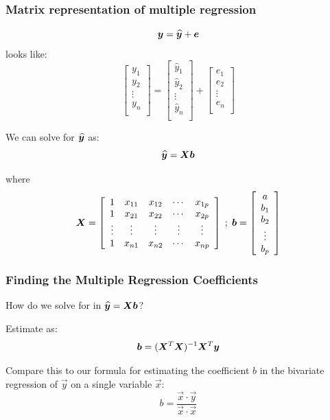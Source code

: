 \documentclass{beamer}
\begin{document}
\begin{frame}
  \frametitle{Matrix representation of multiple regression}


$$
\bm{y} = \widehat{\bm{y}} + \bm{e}
$$
looks like:
$$
\left[ \begin{array}{c}
y_1 \\ y_2 \\ \vdots \\y_n \\
\end{array}
\right] = 
\left[ \begin{array}{c}
\hat{y}_1 \\ \hat{y}_2 \\ \vdots \\\hat{y}_n \\
\end{array}
\right]+
\left[ \begin{array}{c}
e_1 \\ e_2 \\ \vdots \\e_n \\
\end{array}
\right]
$$

\medskip

We can solve for $\widehat{\bm{y}}$ as:
%
$$
\widehat{\bm{y}} = \bm{X}\bm{b}
$$

where
%
$$
\bm{X} = \left[ \begin{array}{ccccc}
1 & x_{11} & x_{12} & \cdots & x_{1p} \\
1 & x_{21} & x_{22} & \cdots & x_{2p} \\
\vdots & \vdots & \vdots & \vdots & \vdots \\
1 & x_{n1} & x_{n2} & \cdots & x_{np} \\
\end{array}
\right]
\;
;
\;
\bm{b} = \left[ \begin{array}{c}
a \\ b_1 \\ b_2 \\ \vdots \\ b_p \\
\end{array}
\right]
$$

\end{frame}
\begin{frame}
  \frametitle{Finding the Multiple Regression Coefficients}

How do we solve for  in $\widehat{\bm{y}} = \bm{X}\bm{b}$?

\bigskip

Estimate  as:
$$
\bm{b} = (\bm{X}^T \bm{X})^{-1}\bm{X}^T\bm{y}
$$

\bigskip

Compare this to our formula for estimating the coefficient $b$ in the bivariate regression of $\Vec{y}$ on a single variable $\Vec{x}$:
$$
b = \frac{\Vec{x} \cdot \Vec{y}}{\Vec{x} \cdot \Vec{x}}
$$


\end{frame}
\end{document}
